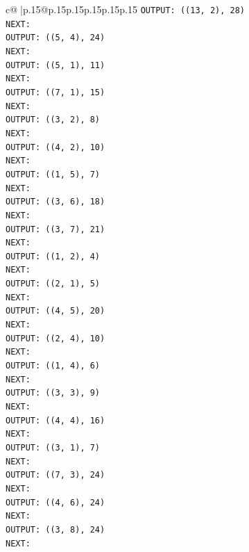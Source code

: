\documentclass{article}
\begin{document}
{\begin{supertabular}{c@{$\;$}|p{.15\linewidth}@{}p{.15\linewidth}p{.15\linewidth}p{.15\linewidth}p{.15\linewidth}p{.15\linewidth}}
{{{\texttt{OUTPUT: ((13, 2), 28)} \\
\texttt{NEXT:} \\
\texttt{OUTPUT: ((5, 4), 24)} \\
\texttt{NEXT:} \\
\texttt{OUTPUT: ((5, 1), 11)} \\
\texttt{NEXT:} \\
\texttt{OUTPUT: ((7, 1), 15)} \\
\texttt{NEXT:} \\
\texttt{OUTPUT: ((3, 2), 8)} \\
\texttt{NEXT:} \\
\texttt{OUTPUT: ((4, 2), 10)} \\
\texttt{NEXT:} \\
\texttt{OUTPUT: ((1, 5), 7)} \\
\texttt{NEXT:} \\
\texttt{OUTPUT: ((3, 6), 18)} \\
\texttt{NEXT:} \\
\texttt{OUTPUT: ((3, 7), 21)} \\
\texttt{NEXT:} \\
\texttt{OUTPUT: ((1, 2), 4)} \\
\texttt{NEXT:} \\
\texttt{OUTPUT: ((2, 1), 5)} \\
\texttt{NEXT:} \\
\texttt{OUTPUT: ((4, 5), 20)} \\
\texttt{NEXT:} \\
\texttt{OUTPUT: ((2, 4), 10)} \\
\texttt{NEXT:} \\
\texttt{OUTPUT: ((1, 4), 6)} \\
\texttt{NEXT:} \\
\texttt{OUTPUT: ((3, 3), 9)} \\
\texttt{NEXT:} \\
\texttt{OUTPUT: ((4, 4), 16)} \\
\texttt{NEXT:} \\
\texttt{OUTPUT: ((3, 1), 7)} \\
\texttt{NEXT:} \\
\texttt{OUTPUT: ((7, 3), 24)} \\
\texttt{NEXT:} \\
\texttt{OUTPUT: ((4, 6), 24)} \\
\texttt{NEXT:} \\
\texttt{OUTPUT: ((3, 8), 24)} \\
\texttt{NEXT:} \\
}}}
\end{supertabular}}
\end{document}
